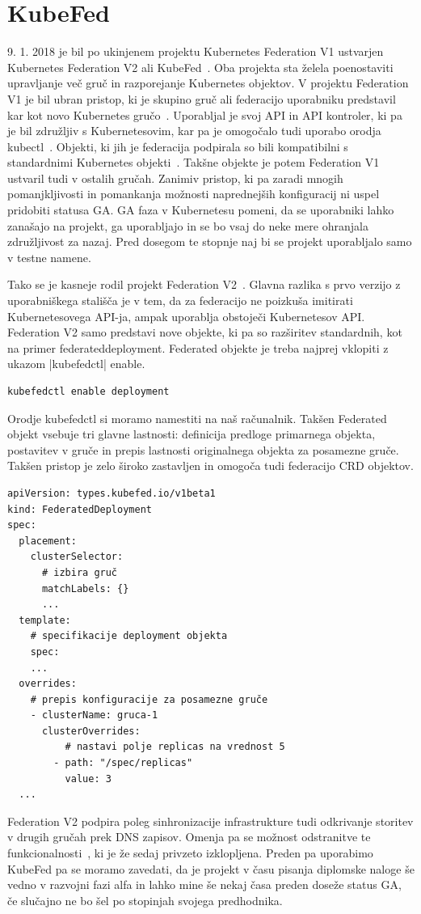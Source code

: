 \documentclass[a4paper, 12pt]{book}
\begin{document}
\section{KubeFed}
9. 1. 2018 je bil po ukinjenem projektu Kubernetes Federation V1 ustvarjen Kubernetes Federation V2 ali KubeFed~\cite{Kubernetes-federation-evolution}.
Oba projekta sta želela poenostaviti upravljanje več gruč in razporejanje Kubernetes objektov.
V projektu Federation V1 je bil ubran pristop, ki je skupino gruč ali federacijo uporabniku predstavil kar kot novo Kubernetes gručo~\cite{setup-cluster-federation-kubefed-v1}.
Uporabljal je svoj API in API kontroler, ki pa je bil združljiv s Kubernetesovim, kar pa je omogočalo tudi uporabo orodja kubectl~\cite{cluster-federation-in-Kubernetes-1.5}.
Objekti, ki jih je federacija podpirala so bili kompatibilni s standardnimi Kubernetes objekti~\cite{federated-cluster-kubefed-v1}.
Takšne objekte je potem Federation V1 ustvaril tudi v ostalih gručah.
Zanimiv pristop, ki pa zaradi mnogih pomanjkljivosti in pomankanja možnosti naprednejših konfiguracij ni uspel pridobiti statusa GA.
GA faza v Kubernetesu pomeni, da se uporabniki lahko zanašajo na projekt, ga uporabljajo in se bo vsaj do neke mere ohranjala združljivost za nazaj.
  Pred dosegom te stopnje naj bi se projekt uporabljalo samo v testne namene.

Tako se je kasneje rodil projekt Federation V2~\cite{Kubernetes-federation-evolution}.
Glavna razlika s prvo verzijo z uporabniškega stališča je v tem, da za federacijo ne poizkuša imitirati Kubernetesovega API-ja, ampak uporablja obstoječi Kubernetesov API. 
Federation V2 samo predstavi nove objekte, ki pa so razširitev standardnih, kot na primer federateddeployment.
Federated objekte je treba najprej vklopiti z ukazom \spverb|kubefedctl| enable.
\begin{verbatim}
kubefedctl enable deployment
\end{verbatim}
Orodje kubefedctl si moramo namestiti na naš računalnik.
Takšen Federated objekt vsebuje tri glavne lastnosti: definicija predloge primarnega objekta, postavitev v gruče in prepis lastnosti originalnega objekta za posamezne gruče.
  Takšen pristop je zelo široko zastavljen in omogoča tudi federacijo CRD objektov.
\begin{verbatim}
apiVersion: types.kubefed.io/v1beta1
kind: FederatedDeployment
spec:
  placement:
    clusterSelector:
      # izbira gruč
      matchLabels: {}
      ... 
  template:
    # specifikacije deployment objekta
    spec:
    ... 
  overrides:
    # prepis konfiguracije za posamezne gruče
    - clusterName: gruca-1
      clusterOverrides:
          # nastavi polje replicas na vrednost 5
        - path: "/spec/replicas"
          value: 3
  ... 
\end{verbatim}
Federation V2 podpira poleg sinhronizacije infrastrukture tudi odkrivanje storitev v drugih gručah prek DNS zapisov.
Omenja pa se možnost odstranitve te funkcionalnosti~\cite{remove-service-discovery}, ki je že sedaj privzeto izklopljena.
Preden pa uporabimo KubeFed pa se moramo zavedati, da je projekt v času pisanja diplomske naloge še vedno v razvojni fazi alfa in lahko mine še nekaj časa preden doseže status GA, če slučajno ne bo šel po stopinjah svojega predhodnika.
\end{document}
